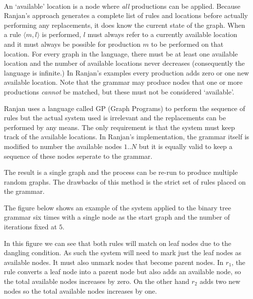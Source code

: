   \paragraph{}

  An `available' location is a node where \emph{all} productions can be applied. Because Ranjan's approach generates a complete list of rules and locations before actually performing any replacements, it does know the current state of the graph. When a rule $\langle m,l \rangle$ is performed, $l$ must always refer to a currently available location and it must always be possible for production $m$ to be performed on that location. For every graph in the language, there must be at least one available location and the number of available locations never decreases (consequently the language is infinite.) In Ranjan's examples every production adds zero or one new available location. Note that the grammar may produce nodes that one or more productions \emph{cannot} be matched, but these must not be considered `available'.
  
  Ranjan uses a language called GP (Graph Programs) to perform the sequence of rules but the actual system used is irrelevant and the replacements can be performed by any means. The only requirement is that the system must keep track of the available locations. In Ranjan's implementation, the grammar itself is modified to number the available nodes $1..N$ but it is equally valid to keep a sequence of these nodes seperate to the grammar.

  The result is a single graph and the process can be re-run to produce multiple random graphs. The drawbacks of this method is the strict set of rules placed on the grammar.

  

  The figure below shows an example of the system applied to the binary tree grammar six times with a single node as the start graph and the number of iterations fixed at $5$.

  

  In this figure we can see that both rules will match on leaf nodes due to the dangling condition. As such the system will need to mark just the leaf nodes as available nodes. It must also unmark nodes that become parent nodes. In $r_1$, the rule converts a leaf node into a parent node but also adds an available node, so the total available nodes increases by zero. On the other hand $r_2$ adds two new nodes so the total available nodes increases by one.

